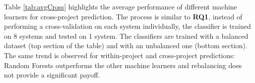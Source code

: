 \begin{table}[t]
	\caption{Average performance of different machine learners for cross-project prediction.}
	\label{tab:avgCross}
	\centering\tiny
	\vspace{-3mm}
\end{table}

Table \ref{tab:avgCross} highlights the average performance of different machine learners for cross-project prediction. The process is similar to \textbf{RQ1}, instead of performing a cross-validation on each system individually, the classifier is trained on 8 systems and tested on 1 system. The classifiers are trained with a balanced dataset (top section of the table) and with an unbalanced one (bottom section). The same trend is observed for within-project and cross-project predictions: Random Forests outperforms the other machine learners and rebalancing does not provide a significant payoff. 

